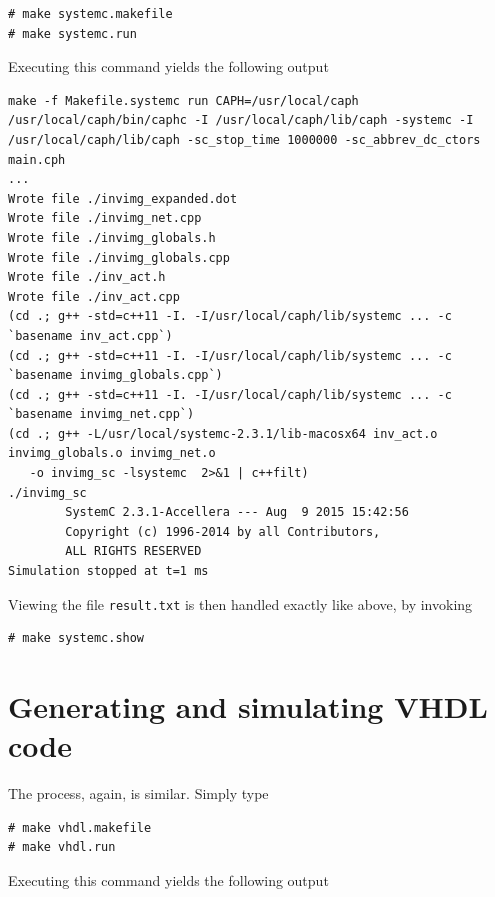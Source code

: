 \begin{lstlisting}[style=BashInputStyle]
# make systemc.makefile
# make systemc.run
\end{lstlisting}

Executing this command yields the following output 

\begin{lstlisting}[style=BashOutputStyle]
make -f Makefile.systemc run CAPH=/usr/local/caph
/usr/local/caph/bin/caphc -I /usr/local/caph/lib/caph -systemc -I /usr/local/caph/lib/caph -sc_stop_time 1000000 -sc_abbrev_dc_ctors  main.cph
...
Wrote file ./invimg_expanded.dot
Wrote file ./invimg_net.cpp
Wrote file ./invimg_globals.h
Wrote file ./invimg_globals.cpp
Wrote file ./inv_act.h
Wrote file ./inv_act.cpp
(cd .; g++ -std=c++11 -I. -I/usr/local/caph/lib/systemc ... -c `basename inv_act.cpp`)
(cd .; g++ -std=c++11 -I. -I/usr/local/caph/lib/systemc ... -c `basename invimg_globals.cpp`)
(cd .; g++ -std=c++11 -I. -I/usr/local/caph/lib/systemc ... -c `basename invimg_net.cpp`)
(cd .; g++ -L/usr/local/systemc-2.3.1/lib-macosx64 inv_act.o invimg_globals.o invimg_net.o
   -o invimg_sc -lsystemc  2>&1 | c++filt)
./invimg_sc
        SystemC 2.3.1-Accellera --- Aug  9 2015 15:42:56
        Copyright (c) 1996-2014 by all Contributors,
        ALL RIGHTS RESERVED
Simulation stopped at t=1 ms
\end{lstlisting}

Viewing the file \verb|result.txt| is then handled exactly like above, by invoking 

\begin{lstlisting}[style=BashInputStyle]
# make systemc.show
\end{lstlisting}

\section{Generating and  simulating VHDL code}
\label{sec:generating-vhdl-2}

The process, again, is similar. Simply type

\begin{lstlisting}[style=BashInputStyle]
# make vhdl.makefile
# make vhdl.run
\end{lstlisting}

Executing this command yields the following output 

